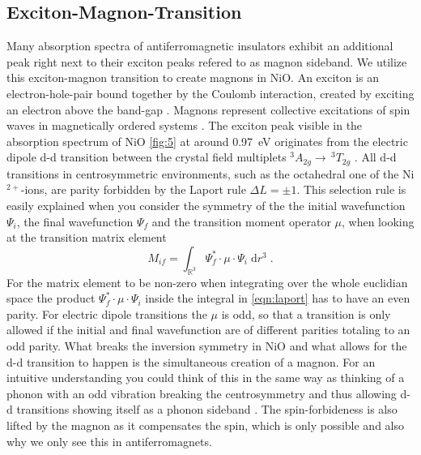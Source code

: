 \subsection{Exciton-Magnon-Transition}
\label{sec:x_m}
Many absorption spectra of antiferromagnetic insulators exhibit an additional peak right next to their exciton peaks  refered to as magnon sideband.
We utilize this exciton-magnon transition to create magnons in NiO.
An exciton is an electron-hole-pair bound together by the Coulomb interaction, created by exciting an electron above the band-gap .
Magnons represent collective excitations of spin waves in magnetically ordered systems .
The exciton peak visible in the absorption spectrum of NiO \autoref{fig:5} at around \qty{0.97}{eV} originates from the electric dipole d-d transition between the crystal field multiplets $^3A_{2g} \rightarrow \, ^3T_{2g}$ .
All d-d transitions in centrosymmetric environments, such as the octahedral one of the Ni$^{2+}$-ions, are parity forbidden by the Laport rule $\Delta L = \pm 1$.
This selection rule is easily explained when you consider the symmetry of the the initial wavefunction $\Psi_i$, the final wavefunction $\Psi_f$ and the transition moment operator $\mu$, when looking at the transition matrix element
\begin{equation}
    M_{if} = \int_{\mathbb{R}^3} \Psi^*_f \cdot \mu \cdot \Psi_i \;\text{d}r^3 \;.
    \label{eqn:laport}
\end{equation}
For the matrix element to be non-zero when integrating over the whole euclidian space the product $\Psi^*_f \cdot \mu \cdot \Psi_i$ inside the integral in \autoref{eqn:laport} has to have an even parity.
For electric dipole transitions the $\mu$ is odd, so that a transition is only allowed if the initial and final wavefunction are of different parities totaling to an odd parity.
What breaks the inversion symmetry in NiO and what allows for the d-d transition to happen is the simultaneous creation of a magnon.
For an intuitive understanding you could think of this in the same way as thinking of a phonon with an odd vibration breaking the centrosymmetry and thus allowing d-d transitions showing itself as a phonon sideband .
The spin-forbideness is also lifted by the magnon as it compensates the spin, which is only possible and also why we only see this in antiferromagnets.
